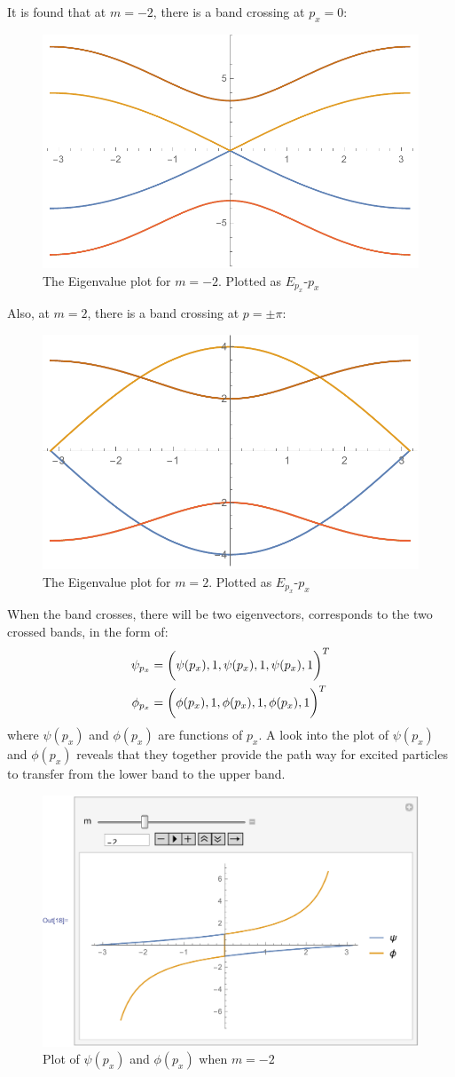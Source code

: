 \documentclass{article}
\begin{document}
It is found that at $m=-2$, there is a band crossing at $p_x=0$:
\begin{figure}[H]
    \centering
    \includegraphics[width=0.6\linewidth]{pics/N6m-2.pdf}
    \caption{The Eigenvalue plot for $m=-2$. Plotted as
    $E_{p_x}$-$p_x$ }
\end{figure}

Also, at $m=2$, there is a band crossing at $p=\pm\pi$:
\begin{figure}[H]
    \centering
    \includegraphics[width=0.6\linewidth]{pics/N6m2.pdf}
    \caption{The Eigenvalue plot for $m=2$. Plotted as
    $E_{p_x}$-$p_x$ }
\end{figure}

When the band crosses, there will be two eigenvectors, corresponds to
the two crossed bands, in the form of:
\begin{align}
    \psi_{p_x} &= \left(\vphantom{\frac12}\psi(p_x),1,\psi(p_x),1,\psi(p_x),1\right)^T \\
    \phi_{p_x} &= \left(\vphantom{\frac12}\phi(p_x),1,\phi(p_x),1,\phi(p_x),1\right)^T
\end{align}
where $\psi(p_x)$ and $\phi(p_x)$ are functions of $p_x$. A look into
the plot of $\psi(p_x)$ and $\phi(p_x)$ reveals that they together
provide the path way for excited particles to transfer from the lower
band to the upper band.
\begin{figure}[H]
    \centering
    \includegraphics[width=0.6\linewidth]{pics/upperSpinWaveMN2.pdf}
    \caption{Plot of $\psi(p_x)$ and $\phi(p_x)$ when $m=-2$}
\end{figure}
\end{document}
